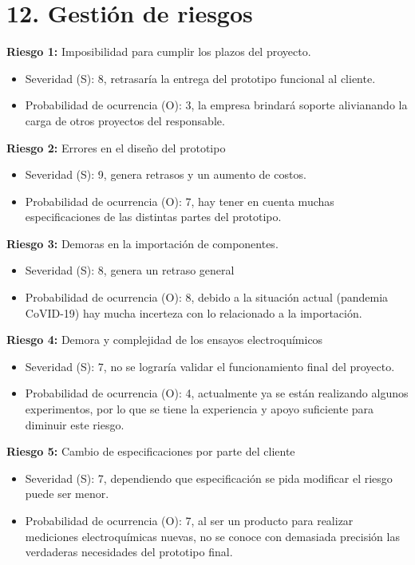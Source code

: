 \documentclass[11pt]{charter}
\begin{document}
\section{12. Gestión de riesgos}
\label{sec:riesgos}

\textbf{Riesgo 1:} Imposibilidad para cumplir los plazos del proyecto.
\begin{itemize}
\item Severidad (S): 8, retrasaría la entrega del prototipo funcional al cliente.
\item Probabilidad de ocurrencia (O): 3, la empresa brindará soporte alivianando la carga de otros proyectos del responsable.
\end{itemize}

\textbf{Riesgo 2:} Errores en el diseño del prototipo
\begin{itemize}
\item Severidad (S): 9, genera retrasos y un aumento de costos.
\item Probabilidad de ocurrencia (O): 7, hay tener en cuenta muchas especificaciones de las distintas partes del prototipo.
\end{itemize}

\textbf{Riesgo 3:} Demoras en la importación de componentes.
\begin{itemize}
\item Severidad (S): 8, genera un retraso general 
\item Probabilidad de ocurrencia (O): 8, debido a la situación actual (pandemia CoVID-19) hay mucha incerteza con lo relacionado a la importación.
\end{itemize}

\textbf{Riesgo 4:} Demora y complejidad de los ensayos electroquímicos
\begin{itemize}
\item Severidad (S): 7, no se lograría validar el funcionamiento final del proyecto.
\item Probabilidad de ocurrencia (O): 4, actualmente ya se están realizando algunos experimentos, por lo que se tiene la experiencia y apoyo suficiente para diminuir este riesgo.
\end{itemize}

\textbf{Riesgo 5:} Cambio de especificaciones por parte del cliente
\begin{itemize}
\item Severidad (S): 7, dependiendo que especificación se pida modificar el riesgo puede ser menor.
\item Probabilidad de ocurrencia (O): 7, al ser un producto para realizar mediciones electroquímicas nuevas, no se conoce con demasiada precisión las verdaderas necesidades del prototipo final.
\end{itemize}
\end{document}
